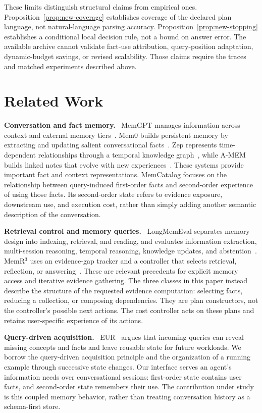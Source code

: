 \documentclass[10pt,twocolumn]{article}
\newcommand{\sys}{MemCatalog}
\newcommand{\runin}[1]{\smallskip\noindent\textbf{#1.}\ }
\begin{document}
These limits distinguish structural claims from empirical ones.
Proposition~\ref{prop:new-coverage} establishes coverage of the declared
plan language, not natural-language parsing accuracy.
Proposition~\ref{prop:new-stopping} establishes a conditional local
decision rule, not a bound on answer error. The available archive
cannot validate fact-use attribution, query-position adaptation,
dynamic-budget savings, or revised scalability. Those claims require
the traces and matched experiments described above.

\section{Related Work}
\label{sec:new-related}

\runin{Conversation and fact memory}
MemGPT manages information across context and external memory
tiers~\cite{memgpt}. Mem0 builds persistent memory by extracting and
updating salient conversational facts~\cite{mem0}. Zep represents
time-dependent relationships through a temporal knowledge
graph~\cite{zep}, while A-MEM builds linked notes that evolve with
new experiences~\cite{amem}. These systems provide important fact
and context representations. \sys{} focuses on the relationship
between query-induced first-order facts and second-order experience
of using those facts. Its second-order state refers to evidence
exposure, downstream use, and execution cost, rather than simply
adding another semantic description of the conversation.

\runin{Retrieval control and memory queries}
LongMemEval separates memory design into indexing, retrieval, and
reading, and evaluates information extraction, multi-session reasoning,
temporal reasoning, knowledge updates, and abstention~\cite{longmemeval}.
MemR$^3$ uses an evidence-gap tracker and a controller that selects
retrieval, reflection, or answering~\cite{memr3}. These are relevant
precedents for explicit memory access and iterative evidence gathering.
The three classes in this paper instead describe the structure of the
requested evidence computation: selecting facts, reducing a collection,
or composing dependencies. They are plan constructors, not the
controller's possible next actions. The cost controller acts on these
plans and retains user-specific experience of its actions.

\runin{Query-driven acquisition}
EUR~\cite{eur} argues that incoming queries can reveal missing concepts
and facts and leave reusable state for future workloads. We borrow
the query-driven acquisition principle and the organization of a
running example through successive state changes. Our interface serves
an agent's information needs over conversational sessions: first-order
state contains user facts, and second-order state remembers their use.
The contribution under study is this coupled memory behavior, rather
than treating conversation history as a schema-first store.
\end{document}
